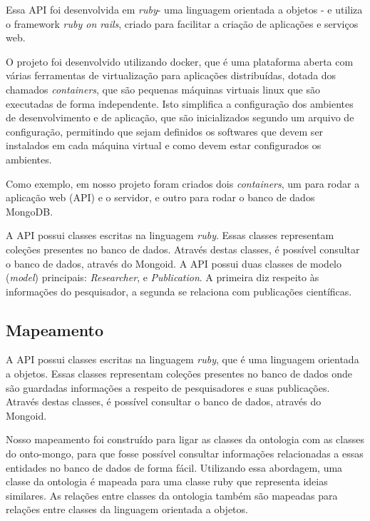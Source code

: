Essa API foi desenvolvida em \textit{ruby}\footnotemark - uma linguagem
orientada a objetos - e utiliza o framework \textit{ruby on rails}\footnotemark,
criado para facilitar a criação de aplicações e serviços web.

O projeto foi desenvolvido utilizando docker, que é uma plataforma aberta com
várias ferramentas de virtualização para aplicações distribuídas, dotada dos
chamados \textit{containers}, que são pequenas máquinas virtuais linux que são
executadas de forma independente. Isto simplifica a configuração dos ambientes
de desenvolvimento e de aplicação, que são inicializados segundo um arquivo
de configuração, permitindo que sejam definidos os softwares que devem ser
instalados em cada máquina virtual e como devem estar configurados os ambientes.

Como exemplo, em nosso projeto foram criados dois \textit{containers}, um
para rodar a aplicação web (API) e o servidor, e outro para rodar o banco
de dados MongoDB.

A API possui classes escritas na linguagem \textit{ruby}. Essas classes
representam coleções presentes no banco de dados. Através destas classes,
é possível consultar o banco de dados, através do Mongoid.  A API possui
duas classes de modelo (\textit{model}) principais: \textit{Researcher},
e \textit{Publication}. A primeira diz respeito às informações do pesquisador,
a segunda se relaciona com publicações científicas.



\subsection{Mapeamento}
A API possui classes escritas na linguagem \textit{ruby}, que é uma linguagem
orientada a objetos. Essas classes representam coleções presentes no banco de
dados onde são guardadas informações a respeito de pesquisadores e suas
publicações. Através destas classes, é possível consultar o banco de dados,
através do Mongoid.

Nosso mapeamento foi construído para ligar as classes da ontologia com as
classes do onto-mongo, para que fosse possível consultar informações
relacionadas a essas entidades no banco de dados de forma fácil. Utilizando essa
 abordagem, uma classe da ontologia é mapeada para uma classe ruby que
 representa ideias similares. As relações entre classes da ontologia também são
 mapeadas para relações entre classes da linguagem orientada a objetos.

